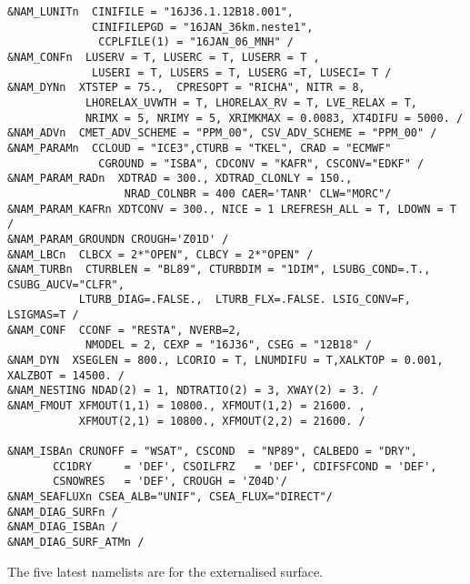 \begin{verbatim}
&NAM_LUNITn  CINIFILE = "16J36.1.12B18.001",
             CINIFILEPGD = "16JAN_36km.neste1",
              CCPLFILE(1) = "16JAN_06_MNH" /
&NAM_CONFn  LUSERV = T, LUSERC = T, LUSERR = T ,
             LUSERI = T, LUSERS = T, LUSERG =T, LUSECI= T /
&NAM_DYNn  XTSTEP = 75.,  CPRESOPT = "RICHA", NITR = 8,
            LHORELAX_UVWTH = T, LHORELAX_RV = T, LVE_RELAX = T,
            NRIMX = 5, NRIMY = 5, XRIMKMAX = 0.0083, XT4DIFU = 5000. /
&NAM_ADVn  CMET_ADV_SCHEME = "PPM_00", CSV_ADV_SCHEME = "PPM_00" /
&NAM_PARAMn  CCLOUD = "ICE3",CTURB = "TKEL", CRAD = "ECMWF"
              CGROUND = "ISBA", CDCONV = "KAFR", CSCONV="EDKF" /
&NAM_PARAM_RADn  XDTRAD = 300., XDTRAD_CLONLY = 150.,
                  NRAD_COLNBR = 400 CAER='TANR' CLW="MORC"/
&NAM_PARAM_KAFRn XDTCONV = 300., NICE = 1 LREFRESH_ALL = T, LDOWN = T /
&NAM_PARAM_GROUNDN CROUGH='Z01D' /
&NAM_LBCn  CLBCX = 2*"OPEN", CLBCY = 2*"OPEN" /
&NAM_TURBn  CTURBLEN = "BL89", CTURBDIM = "1DIM", LSUBG_COND=.T., CSUBG_AUCV="CLFR",
           LTURB_DIAG=.FALSE.,  LTURB_FLX=.FALSE. LSIG_CONV=F, LSIGMAS=T /
&NAM_CONF  CCONF = "RESTA", NVERB=2,
            NMODEL = 2, CEXP = "16J36", CSEG = "12B18" /
&NAM_DYN  XSEGLEN = 800., LCORIO = T, LNUMDIFU = T,XALKTOP = 0.001, XALZBOT = 14500. /
&NAM_NESTING NDAD(2) = 1, NDTRATIO(2) = 3, XWAY(2) = 3. /
&NAM_FMOUT XFMOUT(1,1) = 10800., XFMOUT(1,2) = 21600. ,
           XFMOUT(2,1) = 10800., XFMOUT(2,2) = 21600. /

&NAM_ISBAn CRUNOFF = "WSAT", CSCOND  = "NP89", CALBEDO = "DRY",
       CC1DRY     = 'DEF', CSOILFRZ   = 'DEF', CDIFSFCOND = 'DEF', 
       CSNOWRES   = 'DEF', CROUGH = 'Z04D'/
&NAM_SEAFLUXn CSEA_ALB="UNIF", CSEA_FLUX="DIRECT"/
&NAM_DIAG_SURFn /
&NAM_DIAG_ISBAn /
&NAM_DIAG_SURF_ATMn /
\end{verbatim}
The five latest namelists are for the externalised surface.

